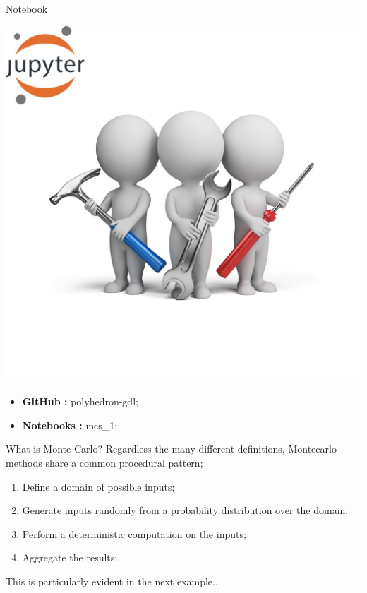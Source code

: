 \documentclass[11pt]{beamer}
\begin{document}
\begin{frame}{Notebook}
\noindent\begin{minipage}{0.5\textwidth}%
\includegraphics[width=\linewidth]{img/exercise.jpg}
\end{minipage}%
\hfill%
\begin{minipage}{0.5\textwidth}
\begin{itemize}
\item {\bf GitHub        : }    polyhedron-gdl;
\item {\bf Notebooks  : }    mcs\_1;
\end{itemize}
\end{minipage}
\end{frame}
\begin{frame}{What is Monte Carlo?}
Regardless the many different definitions, Montecarlo methods share a common procedural pattern;
\begin{enumerate}
\item Define a domain of possible inputs;
\item Generate inputs randomly from a probability distribution over the domain;
\item Perform a deterministic computation on the inputs;
\item Aggregate the results;
\end{enumerate}
This is particularly evident in the next example...
\end{frame}
\end{document}
